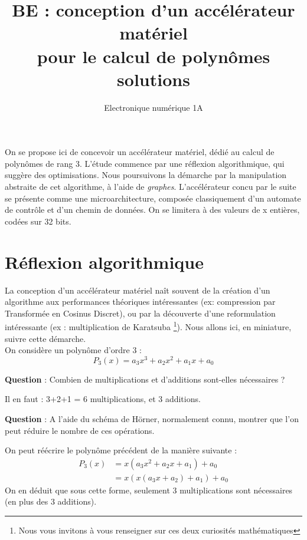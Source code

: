 \documentclass[a4paper,11pt]{exam}
\title{BE : conception d'un accélérateur matériel\\pour le calcul de polynômes\\\textbf{solutions}}
\author{Electronique numérique 1A}
\begin{document}
\maketitle

On se propose ici de concevoir un accélérateur matériel, dédié au calcul de polynômes de rang 3. L'étude commence par une réflexion algorithmique, qui suggère des optimisations. Nous poursuivons la démarche par la manipulation abstraite de cet algorithme, à l'aide de \textit{graphes}. L'accélérateur concu par le suite se présente comme une microarchitecture, composée classiquement d'un automate de contrôle et d'un chemin de données.  On se limitera à des valeurs de x entières, codées sur 32 bits.

\section{Réflexion algorithmique}

La conception d'un accélérateur matériel naît souvent de la création d'un algorithme aux performances théoriques intéressantes (ex: compression par Transformée en Cosinus Discret), ou par
la découverte d'une reformulation intéressante (ex : multiplication de Karatsuba \footnote{Nous vous invitons à vous renseigner sur ces deux curiosités mathématiques}). Nous allons ici, en miniature, suivre cette démarche.\\
On considère un polynôme d'ordre 3 :
\begin{equation}
P_3(x)=a_3x^3+a_2x^2+a_1x+a_0
\end{equation}

\begin{questions}
  \question \textbf{Question} : Combien de multiplications et d'additions sont-elles nécessaires ?
    \begin{solution}
    Il en faut : 3+2+1 = 6 multiplications, et 3 additions.
    \end{solution}
  \question \textbf{Question} : A l'aide du schéma de Hörner, normalement connu, montrer que l'on peut réduire le nombre de ces opérations.
    \begin{solution}
    On peut réécrire le polynôme précédent de la manière suivante :
    \begin{align}
      P_3(x) &= x(a_3x^2+a_2x+a_1)+a_0 \\
             &=x(x(a_3x+a_2)+a_1)+a_0
    \end{align}
    On en déduit que sous cette forme, seulement 3 multiplications sont nécessaires (en plus des 3 additions).
    \end{solution}
\end{questions}
\end{document}
